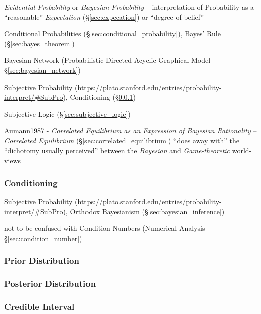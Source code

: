 \emph{Evidential Probability} or \emph{Bayesian Probability} -- interpretation
of Probability as a ``reasonable'' \emph{Expectation} (\S\ref{sec:expecation})
or ``degree of belief''

Conditional Probabilities (\S\ref{sec:conditional_probability}), Bayes' Rule
(\S\ref{sec:bayes_theorem})

\fist Bayesian Network (Probabilistic Directed Acyclic Graphical Model
\S\ref{sec:bayesian_network})

Subjective Probability %
(\url{https://plato.stanford.edu/entries/probability-interpret/#SubPro}),
Conditioning (\S\ref{sec:conditioning})

\fist Subjective Logic (\S\ref{sec:subjective_logic})

\fist Aumann1987 - \emph{Correlated Equilibrium as an Expression of Bayesian
  Rationality} -- \emph{Correlated Equilibrium}
(\S\ref{sec:correlated_equilibrium}) ``does away with'' the ``dichotomy usually
perceived'' between the \emph{Bayesian} and \emph{Game-theoretic} world-views



\subsubsection{Conditioning}\label{sec:conditioning}


Subjective Probability
(\url{https://plato.stanford.edu/entries/probability-interpret/#SubPro}),
Orthodox Bayesianism (\S\ref{sec:bayesian_inference})

\fist not to be confused with Condition Numbers (Numerical Analysis
\S\ref{sec:condition_number})



\subsubsection{Prior Distribution}\label{sec:prior_distribution}

\subsubsection{Posterior Distribution}\label{sec:posterior_distribution}

\subsubsection{Credible Interval}\label{sec:credible_interval}

